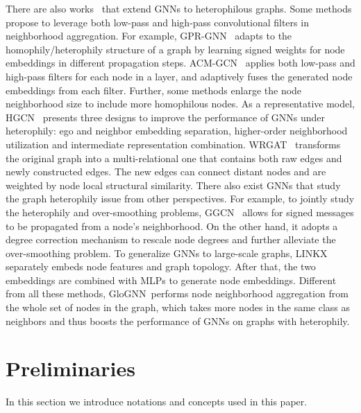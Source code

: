 \documentclass[nohyperref]{article}
\theoremstyle{plain}
\theoremstyle{definition}
\theoremstyle{remark}
\newcommand{\ada}{GloGNN}
\begin{document}
There are also works~\cite{zhu2020beyond,bo2021beyond,chien2020adaptive,yan2021two,suresh2021breaking,pei2020geom,dong2021graph,lim2021large,yang2021graph,luan2021heterophily,zhu2020graph,liu2021non}
that extend
GNNs to heterophilous graphs. 
Some methods propose to leverage both low-pass and high-pass convolutional filters 
in neighborhood aggregation.
For example,
GPR-GNN~\cite{chien2020adaptive}
adapts to the homophily/heterophily structure of a graph
by learning signed weights for node embeddings in different propagation steps.
ACM-GCN~\cite{luan2021heterophily} applies both low-pass and high-pass filters for each node in a layer,
and adaptively fuses the generated node embeddings from each filter.
Further,
some methods enlarge the node neighborhood size to include more homophilous nodes.
As a representative model, 
HGCN~\cite{zhu2020beyond} 
presents three designs to improve the performance of GNNs under heterophily:
ego and neighbor embedding separation, 
higher-order neighborhood utilization and 
intermediate representation combination.
WRGAT~\cite{suresh2021breaking}
transforms the original graph into a multi-relational one that 
contains both raw edges and newly constructed edges.
The new edges 
can connect distant nodes and are weighted by 
node local structural similarity.
There also exist GNNs that study the graph heterophily issue from other perspectives.
For example,
to jointly study
the heterophily and over-smoothing problems,
GGCN~\cite{yan2021two} allows for signed messages to be propagated from a node's neighborhood.
On the other hand,
it adopts a degree correction mechanism to rescale node degrees and further alleviate the over-smoothing problem.
To generalize GNNs to large-scale graphs,
LINKX~\cite{lim2021large}
separately embeds node features and graph topology.
After that,
the two embeddings are combined with MLPs to generate node embeddings.
Different from all these methods,
\ada\ performs node neighborhood aggregation from the whole set of nodes in the graph,
which takes more nodes in the same class as neighbors and thus boosts the performance of GNNs on graphs with heterophily.










 \section{Preliminaries}
\label{sec:preliminary}
In this section we introduce notations and concepts used in this paper.
\end{document}
